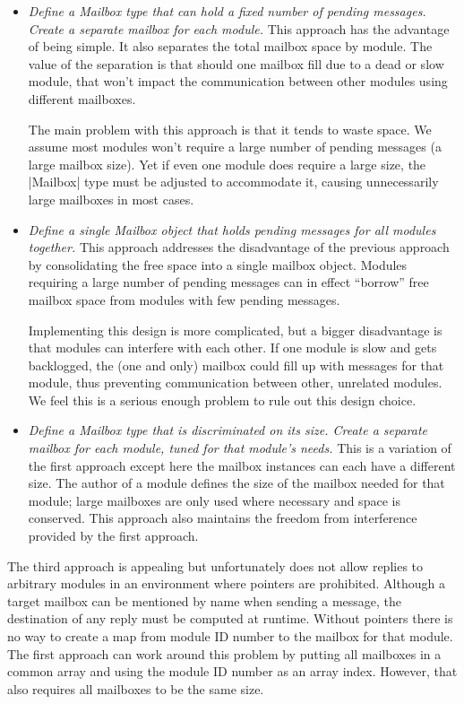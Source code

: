 \begin{itemize}
\item \emph{Define a Mailbox type that can hold a fixed number of pending messages. Create a
    separate mailbox for each module.} This approach has the advantage of being simple. It also
  separates the total mailbox space by module. The value of the separation is that should one
  mailbox fill due to a dead or slow module, that won't impact the communication between other
  modules using different mailboxes.

  The main problem with this approach is that it tends to waste space. We assume most modules
  won't require a large number of pending messages (a large mailbox size). Yet if even one
  module does require a large size, the |Mailbox| type must be adjusted to accommodate it,
  causing unnecessarily large mailboxes in most cases.

\item \emph{Define a single Mailbox object that holds pending messages for all modules
    together.} This approach addresses the disadvantage of the previous approach by
  consolidating the free space into a single mailbox object. Modules requiring a large number of
  pending messages can in effect ``borrow'' free mailbox space from modules with few pending
  messages.

  Implementing this design is more complicated, but a bigger disadvantage is that modules can
  interfere with each other. If one module is slow and gets backlogged, the (one and only)
  mailbox could fill up with messages for that module, thus preventing communication between
  other, unrelated modules. We feel this is a serious enough problem to rule out this design
  choice.

\item \emph{Define a Mailbox type that is discriminated on its size. Create a separate mailbox
    for each module, tuned for that module's needs.} This is a variation of the first approach
  except here the mailbox instances can each have a different size. The author of a module
  defines the size of the mailbox needed for that module; large mailboxes are only used where
  necessary and space is conserved. This approach also maintains the freedom from interference
  provided by the first approach.
\end{itemize}

The third approach is appealing but unfortunately does not allow replies to arbitrary modules in
an environment where pointers are prohibited. Although a target mailbox can be mentioned by name
when sending a message, the destination of any reply must be computed at runtime. Without
pointers there is no way to create a map from module ID number to the mailbox for that module.
The first approach can work around this problem by putting all mailboxes in a common array and
using the module ID number as an array index. However, that also requires all mailboxes to be
the same size.

